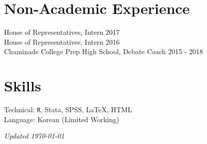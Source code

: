 \documentclass[margin, line]{res}
\begin{document}
\begin{resume}
\section{Non-Academic Experience}
House of Representatives, Intern \hfill 2017\\
House of Representatives, Intern \hfill 2016\\
Chaminade College Prep High School, Debate Coach \hfill 2015 - 2018

\section{Skills}
Technical: \texttt{R}, Stata, SPSS, \LaTeX, HTML\\
Language: Korean (Limited Working)

\vspace*{\fill}

\hfill \small{\textit{Updated \today}}

\end{resume}
\end{document}
